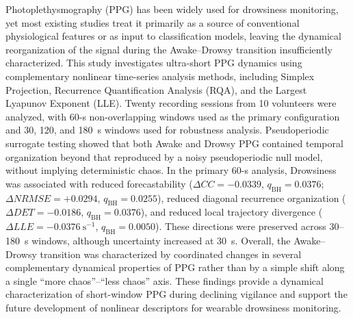 Photoplethysmography (PPG) has been widely used for drowsiness monitoring, yet most existing studies treat it primarily as a source of conventional physiological features or as input to classification models, leaving the dynamical reorganization of the signal during the Awake--Drowsy transition insufficiently characterized. This study investigates ultra-short PPG dynamics using complementary nonlinear time-series analysis methods, including Simplex Projection, Recurrence Quantification Analysis (RQA), and the Largest Lyapunov Exponent (LLE). Twenty recording sessions from 10 volunteers were analyzed, with 60-s non-overlapping windows used as the primary configuration and 30, 120, and 180~s windows used for robustness analysis. Pseudoperiodic surrogate testing showed that both Awake and Drowsy PPG contained temporal organization beyond that reproduced by a noisy pseudoperiodic null model, without implying deterministic chaos. In the primary 60-s analysis, Drowsiness was associated with reduced forecastability ($\Delta CC=-0.0339$, $q_{\mathrm{BH}}=0.0376$; $\Delta NRMSE=+0.0294$, $q_{\mathrm{BH}}=0.0255$), reduced diagonal recurrence organization ($\Delta DET=-0.0186$, $q_{\mathrm{BH}}=0.0376$), and reduced local trajectory divergence ($\Delta LLE=-0.0376~\mathrm{s}^{-1}$, $q_{\mathrm{BH}}=0.0050$). These directions were preserved across 30--180~s windows, although uncertainty increased at 30~s. Overall, the Awake--Drowsy transition was characterized by coordinated changes in several complementary dynamical properties of PPG rather than by a simple shift along a single ``more chaos''--``less chaos'' axis. These findings provide a dynamical characterization of short-window PPG during declining vigilance and support the future development of nonlinear descriptors for wearable drowsiness monitoring.